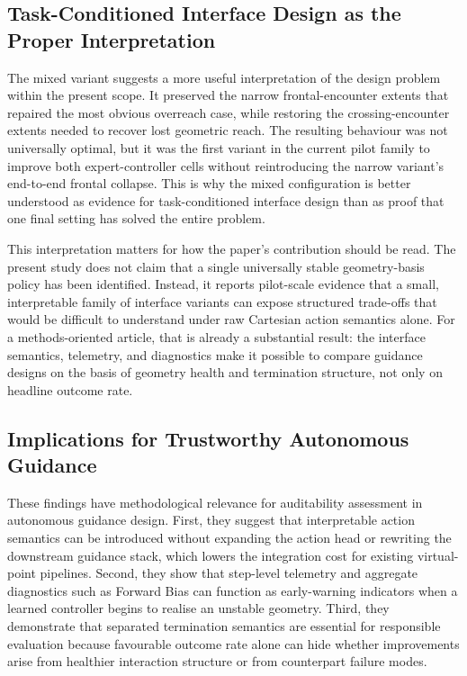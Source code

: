 \documentclass[drones,article,submit,pdftex,moreauthors]{Definitions/mdpi}
\begin{document}
\subsection{Task-Conditioned Interface Design as the Proper Interpretation}

The mixed variant suggests a more useful interpretation of the design problem within the present scope. It preserved the narrow frontal-encounter extents that repaired the most obvious overreach case, while restoring the crossing-encounter extents needed to recover lost geometric reach. The resulting behaviour was not universally optimal, but it was the first variant in the current pilot family to improve both expert-controller cells without reintroducing the narrow variant's end-to-end frontal collapse. This is why the mixed configuration is better understood as evidence for task-conditioned interface design than as proof that one final setting has solved the entire problem.

This interpretation matters for how the paper's contribution should be read. The present study does not claim that a single universally stable geometry-basis policy has been identified. Instead, it reports pilot-scale evidence that a small, interpretable family of interface variants can expose structured trade-offs that would be difficult to understand under raw Cartesian action semantics alone. For a methods-oriented article, that is already a substantial result: the interface semantics, telemetry, and diagnostics make it possible to compare guidance designs on the basis of geometry health and termination structure, not only on headline outcome rate.

\subsection{Implications for Trustworthy Autonomous Guidance}

These findings have methodological relevance for auditability assessment in autonomous guidance design. First, they suggest that interpretable action semantics can be introduced without expanding the action head or rewriting the downstream guidance stack, which lowers the integration cost for existing virtual-point pipelines. Second, they show that step-level telemetry and aggregate diagnostics such as Forward Bias can function as early-warning indicators when a learned controller begins to realise an unstable geometry. Third, they demonstrate that separated termination semantics are essential for responsible evaluation because favourable outcome rate alone can hide whether improvements arise from healthier interaction structure or from counterpart failure modes.
\end{document}
